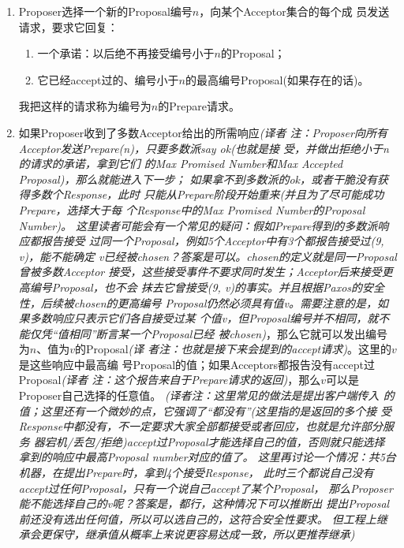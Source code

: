 \begin{enumerate}
\item Proposer选择一个新的Proposal编号\(n\)，向某个Acceptor集合的每个成
员发送请求，要求它回复：
\begin{enumerate}
\item 一个承诺：以后绝不再接受编号小于\(n\)的Proposal；
\item 它已经accept过的、编号小于\(n\)的最高编号Proposal(如果存在的话)。
\end{enumerate}
我把这样的请求称为编号为\(n\)的Prepare请求。

\item 如果Proposer收到了多数Acceptor给出的所需响应\emph{(译者
注：Proposer向所有Acceptor发送Prepare(n)，只要多数派say ok(也就是接
受，并做出拒绝小于n的请求的承诺，拿到它们
的Max Promised Number和Max Accepted Proposal)，那么就能进入下一步；
如果拿不到多数派的ok，或者干脆没有获得多数个Response，此时
只能从Prepare阶段开始重来(并且为了尽可能成功Prepare，选择大于每
个Response中的Max Promised Number的Proposal Number)。
这里读者可能会有一个常见的疑问：假如Prepare得到的多数派响应都报告接受
过同一个Proposal，例如5个Acceptor中有3个都报告接受过(9, v)，能不能确定
v已经被chosen？答案是可以。chosen的定义就是同一Proposal曾被多数Acceptor
接受，这些接受事件不要求同时发生；Acceptor后来接受更高编号Proposal，也不会
抹去它曾接受(9, v)的事实。并且根据Paxos的安全性，后续被chosen的更高编号
Proposal仍然必须具有值v。需要注意的是，如果多数响应只表示它们各自接受过某
个值v，但Proposal编号并不相同，就不能仅凭“值相同”断言某一个Proposal已经
被chosen)}，那么它就可以发出编号为\(n\)、值为\(v\)的Proposal\emph{(译
者注：也就是接下来会提到的accept请求)}。这里的\(v\)是这些响应中最高编
号Proposal的值；如果Acceptors都报告没有accept过Proposal\emph{(译者
注：这个报告来自于Prepare请求的返回)}，那么\(v\)可以是
Proposer自己选择的任意值。
\emph{(译者注：这里常见的做法是提出客户端传入
的值；这里还有一个微妙的点，它强调了“都没有”(这里指的是返回的多个接
受Response中都没有，不一定要求大家全部都接受或者回应，也就是允许部分服务
器宕机/丢包/拒绝)accept过Proposal才能选择自己的值，否则就只能选择
拿到的响应中最高Proposal number对应的值了。
这里再讨论一个情况：共5台机器，在提出Prepare时，拿到4个接受Response，
此时三个都说自己没有accept过任何Proposal，只有一个说自己accept了某个Proposal，
那么Proposer能不能选择自己的v呢？答案是，都行，这种情况下可以推断出
提出Proposal前还没有选出任何值，所以可以选自己的，这符合安全性要求。
但工程上继承会更保守，继承值从概率上来说更容易达成一致，所以更推荐继承)}
\end{enumerate}

